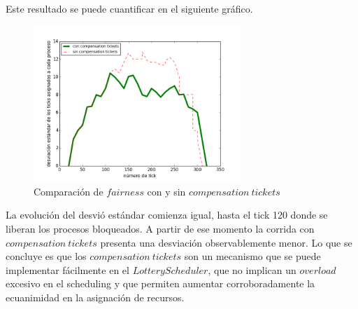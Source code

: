 \documentclass[11pt, a4paper, twoside]{article}
\begin{document}
Este resultado se puede cuantificar en el siguiente gráfico.

\begin{figure}[H]
\centering
\includegraphics[width=0.7\textwidth]{../experimentacion/ej10-compensation/plot-comparativa.png}
\caption{Comparación de $fairness$ con y sin $compensation\ tickets$}
\end{figure}

La evolución del desvió estándar comienza igual, hasta el tick 120 donde se liberan los procesos bloqueados. A partir de ese momento la corrida con $compensation\ tickets$ presenta una desviación observablemente menor. Lo que se concluye es que los $compensation\ tickets$ son un mecanismo que se puede implementar fácilmente en el $Lottery Scheduler$, que no implican un $overload$ excesivo en el scheduling y que permiten aumentar corroboradamente la ecuanimidad en la asignación de recursos.
\end{document}
